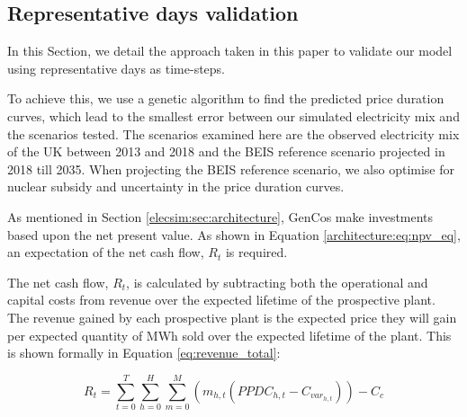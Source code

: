 \subsection{Representative days validation}
\label{elecsim:ssec:representative_validation}

In this Section, we detail the approach taken in this paper to validate our model using representative days as time-steps. 

To achieve this, we use a genetic algorithm to find the predicted price duration curves, which lead to the smallest error between our simulated electricity mix and the scenarios tested. The scenarios examined here are the observed electricity mix of the UK between 2013 and 2018 and the BEIS reference scenario projected in 2018 till 2035. When projecting the BEIS reference scenario, we also optimise for nuclear subsidy and uncertainty in the price duration curves.






As mentioned in Section \ref{elecsim:sec:architecture}, GenCos make investments based upon the net present value. As shown in Equation \ref{architecture:eq:npv_eq}, an expectation of the net cash flow, $R_t$ is required. 

The net cash flow, $R_t$, is calculated by subtracting both the operational and capital costs from revenue over the expected lifetime of the prospective plant. The revenue gained by each prospective plant is the expected price they will gain per expected quantity of MWh sold over the expected lifetime of the plant. This is shown formally in Equation \ref{eq:revenue_total}:


\begin{equation}
\label{eq:revenue_total}
R_t = 
\sum\limits_{t=0}^T 
\sum\limits_{h=0}^H
\sum\limits_{m=0}^M \left(
m_{h,t}(PPDC_{h,t}
-
C_{var_{h,t}})\right)
- C_c
\end{equation}

